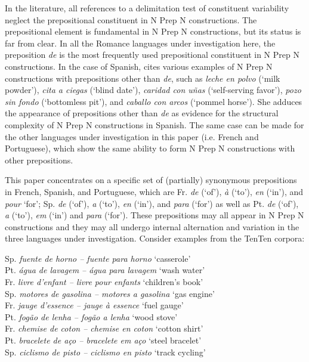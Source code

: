\documentclass[output=paper]{langsci/langscibook}
\begin{document}
In the literature, all references to a delimitation test of constituent variability neglect the prepositional constituent in N Prep N constructions. The prepositional element is fundamental in N Prep N constructions, but its status is far from clear. In all the Romance languages under investigation here, the preposition \textit{de} is the most frequently used prepositional constituent in N Prep N constructions. In the case of Spanish, \citet{BuenafuentesdelaMata:2010} cites various examples of N Prep N constructions with prepositions other than \textit{de}, such as \textit{leche en polvo} (`milk powder'), \textit{cita a ciegas} (`blind date'), \textit{caridad con uñas} (`self-serving favor'), \textit{pozo sin fondo} (`bottomless pit'), and \textit{caballo con arcos} (`pommel horse'). She adduces the appearance of prepositions other than \textit{de} as evidence for the structural complexity of N Prep N constructions in Spanish. The same case can be made for the other languages under investigation in this paper (i.e. French and Portuguese), which show the same ability to form N Prep N constructions with other prepositions.
 
 This paper concentrates on a specific set of (partially) synonymous prepositions in French, Spanish, and Portuguese, which are Fr. \textit{de} (`of'), \textit{à} (`to'), \textit{en} (`in'), and \textit{pour} `for'; Sp. \textit{de} (`of'), \textit{a} (`to'), \textit {en} (`in'), and \textit{para} (`for') as well as Pt. \textit{de} (`of'), \textit{a} (`to'), \textit{em} (`in') and \textit{para} (`for'). These prepositions may all appear in N Prep N constructions and they may all undergo internal alternation and variation in the three languages under investigation. Consider examples  from the TenTen corpora:
 
\ea \label{ex:hennecke:1}
  \ea\label{ex:hennecke:1a} Sp. \textit{fuente de horno – fuente para horno}   `casserole' \\ 
  \ex\label{ex:hennecke:1b} Pt. \textit{água de lavagem – água para lavagem}     `wash water' \\ 
  \ex\label{ex:hennecke:1c} Fr. \textit{livre d'enfant – livre pour enfants}    `children’s book' \\ 
 \z
\ex  \label{ex:hennecke:2}
  \ea\label{ex:hennecke:2a} Sp. \textit{motores de gasolina – motores a gasolina}    `gas engine' \\ 
  \ex\label{ex:hennecke:2b} Fr. \textit{jauge d'essence – jauge à essence}   `fuel gauge' \\ 
  \ex\label{ex:hennecke:2c} Pt. \textit{fogão de lenha – fogão a lenha}   `wood stove' \\ 
 \z
\ex \label{ex:hennecke:3}
  \ea\label{ex:hennecke:3a} Fr. \textit{chemise de coton – chemise en coton}   `cotton shirt' \\ 
  \ex\label{ex:hennecke:3b} Pt. \textit{bracelete de aço – bracelete em aço}  `steel bracelet' \\ 
  \ex\label{ex:hennecke:3c} Sp. \textit{ciclismo de pisto – ciclismo en pisto}   `track cycling' \\ 
  \z
\z
 
\end{document}
